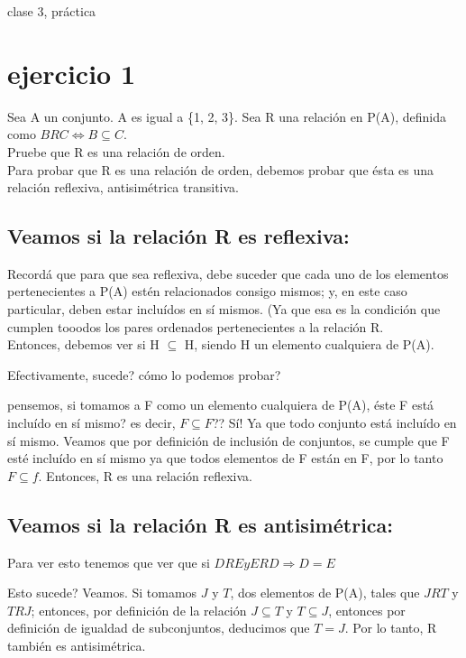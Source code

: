 clase 3, práctica

\section{ejercicio 1}

Sea A un conjunto. A es igual a \{1, 2, 3\}. Sea R una relación en P(A), definida como $ BRC \Leftrightarrow B \subseteq C$.\\


Pruebe que R es una relación de orden.\\

Para probar que R es una relación de orden, debemos probar que ésta es una relación reflexiva, antisimétrica  transitiva.\\

\subsection{Veamos si la relación R es reflexiva:}

Recordá que para que sea reflexiva, debe suceder que cada uno de los elementos pertenecientes a P(A) estén relacionados consigo mismos; y, en este caso particular, deben estar incluídos en sí mismos. (Ya que esa es la condición que cumplen tooodos los pares ordenados pertenecientes a la relación R.\\

Entonces, debemos ver si H $\subseteq$ H, siendo H un elemento cualquiera de P(A).

Efectivamente, sucede? cómo lo podemos probar?

pensemos, si tomamos a F como un elemento cualquiera de P(A), éste F está incluído en sí mismo? es decir, $F \subseteq F$?? Sí! Ya que todo conjunto está incluído en sí mismo. Veamos que por definición de inclusión de conjuntos, se cumple que F esté incluído en sí mismo ya que todos elementos de F están en F, por lo tanto $F \subseteq f$. Entonces, R es una relación reflexiva. 

\subsection{Veamos si la relación R es antisimétrica:}

Para ver esto tenemos que ver que si $DRE y ERD \Rightarrow D = E$

Esto sucede? Veamos. Si tomamos $J$ y $T$, dos elementos de P(A), tales que $JRT$ y $TRJ$; entonces, por definición de la relación $J \subseteq T$ y $ T\subseteq J$, entonces por definición de igualdad de subconjuntos, deducimos que $T=J$. Por lo tanto, R también es antisimétrica.




